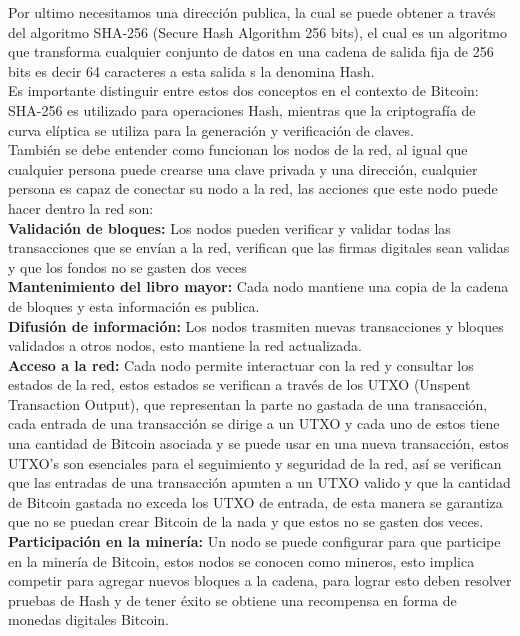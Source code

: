 \documentclass{rbf}
\begin{document}
Por ultimo necesitamos una dirección publica, la cual se puede obtener a través del algoritmo SHA-256 (Secure Hash Algorithm 256 bits), el cual es un algoritmo que transforma cualquier conjunto de datos en una cadena de salida fija de 256 bits es decir 64 caracteres a esta salida s la denomina Hash.
\\ 
Es importante distinguir entre estos dos conceptos en el contexto de Bitcoin: SHA-256 es utilizado para operaciones Hash, mientras que la criptografía de curva elíptica se utiliza para la generación y verificación de claves.
\\
También se debe entender como funcionan los nodos de la red, al igual que cualquier persona puede crearse una clave privada y una dirección, cualquier persona es capaz de conectar su nodo a la red, las acciones que este nodo puede hacer dentro la red son: 
\\
\textbf{Validación de bloques:} Los nodos pueden verificar y validar todas las transacciones que se envían a la red, verifican que las firmas digitales sean validas  y que los fondos no se gasten dos veces
\\
\textbf{Mantenimiento del libro mayor:} Cada nodo mantiene una copia de la cadena de bloques y esta información es publica.
\\
\textbf{Difusión de información:} Los nodos trasmiten nuevas transacciones y bloques validados a otros nodos, esto mantiene la red actualizada.
\\
\textbf{Acceso a la red:} Cada nodo permite interactuar con la red y consultar los estados de la red, estos estados se verifican a través de los UTXO (Unspent Transaction Output), que representan la parte no gastada de una transacción, cada entrada de una transacción se dirige a un UTXO y cada uno de estos tiene una cantidad de Bitcoin asociada y se puede usar en una nueva transacción, estos UTXO's son esenciales para el seguimiento y seguridad de la red, así se verifican que las entradas de una transacción apunten a un UTXO valido y que la cantidad de Bitcoin gastada no exceda los UTXO de entrada, de esta manera se garantiza que no se puedan crear Bitcoin de la nada y que estos no se gasten dos veces. 
\\
\textbf{Participación en la minería:} Un nodo se puede configurar para que participe en la minería de Bitcoin, estos nodos se conocen como mineros, esto implica competir para agregar nuevos bloques a la cadena, para lograr esto deben resolver pruebas de Hash  y de tener éxito se obtiene una recompensa en forma de monedas digitales Bitcoin.
\\
\end{document}
